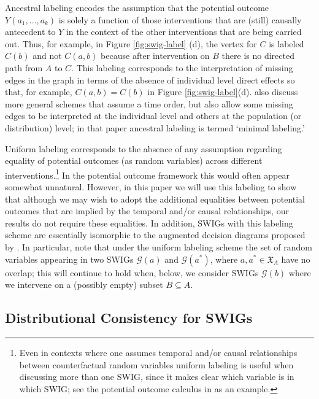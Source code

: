 \documentclass[11pt]{article}
\newcommand{\G}{{\mathscr G}}
\begin{document}
Ancestral labeling encodes the assumption that the potential outcome $Y(a_1,\ldots ,a_k)$ is solely a function of those interventions that are (still) causally antecedent to $Y$ in the context of the other interventions that are being carried out. Thus, for example, in Figure \ref{fig:swig-label} (d), the vertex for $C$ is labeled $C(b)$ and not $C(a,b)$ because after intervention on $B$ there is no directed path from $A$ to $C$.
This labeling corresponds to the interpretation of missing edges in the graph in terms of the absence of individual level direct effects so that, for example, 
$C(a,b) = C(b)$ in Figure \ref{fig:swig-label}(d). \citet[\S 7]{thomas13swig} also discuss more general schemes that assume a time order, but also allow some missing edges to be interpreted at the individual level and others at the population (or distribution) level; in that paper ancestral labeling is termed `minimal labeling.'

Uniform labeling corresponds to the absence of any assumption regarding equality of potential outcomes (as random variables) across different interventions.\footnote{
Even in contexts where one assumes temporal and/or causal relationships between counterfactual random variables uniform labeling is useful when discussing more than one SWIG, since it makes clear which variable is in which SWIG; see the potential outcome calculus in \citet{malinsky19po} as an example.}
 In the potential outcome framework this would often appear somewhat unnatural. 
However, in this paper we will use this labeling to show that although we may wish to adopt the additional equalities between potential outcomes that are implied by the temporal and/or causal relationships, our results do not require these equalities. In addition, SWIGs with this labeling scheme are essentially isomorphic to the augmented decision diagrams proposed by \citet{dawid:2021}.  In particular, note that under the uniform labeling scheme the set of random variables appearing in two SWIGs $\G({ a})$ and $\G({ a^*})$, where $a,a^*\in \mathfrak{X}_A$  have no overlap; this will continue to hold when, below, we consider SWIGs $\G({ b})$ where we intervene on a (possibly empty) subset $B\subseteq A$.



\subsection{Distributional Consistency for SWIGs}
\end{document}
